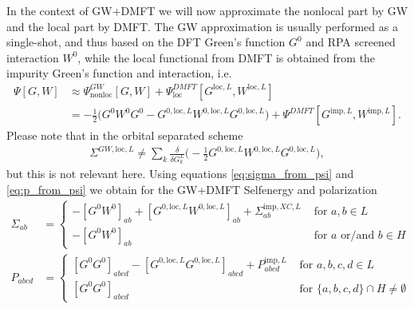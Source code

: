 \documentclass[12pt,a4paper]{scrartcl}
\numberwithin{equation}{section}
\begin{document}
In the context of GW+DMFT we will now approximate the nonlocal part by GW and the local part
by DMFT. The GW approximation is usually performed as a single-shot, and thus
based on the DFT Green's function $G^0$ and RPA screened interaction $W^0$,
while the local functional from DMFT is obtained from the impurity Green's function and
interaction, i.e.
\begin{align}
\Psi[G,W] &\approx \Psi^{GW}_{\mathrm{nonloc}}[G,W] + \Psi^{DMFT}_{\mathrm{loc}}[G^{\mathrm{loc},L},W^{\mathrm{loc},L}] \\
&= -\frac{1}{2}\Big( G^0W^0G^0 - G^{0,\mathrm{loc},L}W^{0,\mathrm{loc},L}G^{0,\mathrm{loc},L}  \Big)
                    + \Psi^{DMFT}[G^{\mathrm{imp},L},W^{\mathrm{imp},L}] .
\end{align}
Please note that in the orbital separated scheme 
\begin{align}
 \Sigma^{GW,\mathrm{loc},L} \neq \sum_k \frac{\delta}{\delta G^L_k}
             \Big( -\frac{1}{2} G^{0,\mathrm{loc},L}W^{0,\mathrm{loc},L}G^{0,\mathrm{loc},L} \Big),
\end{align}
but this is not relevant here.
Using equations \eqref{eq:sigma_from_psi} and \eqref{eq:p_from_psi} we obtain for the GW+DMFT
Selfenergy and polarization
\begin{align}
\Sigma_{ab} &= 
\begin{cases}
-[G^0W^0]_{ab} + [G^{0,\mathrm{loc},L}W^{0,\mathrm{loc},L}]_{ab}+ \Sigma_{ab}^{\mathrm{imp},XC,L} & \mbox{ for } a,b \in L  \\
-[G^0W^0]_{ab}                                                                      & \mbox{ for } a \mbox{ or/and } b \in H 
\end{cases}\\
%
%
P_{abcd} &= 
\begin{cases}
[G^0G^0]_{abcd} - [G^{0,\mathrm{loc},L}G^{0,\mathrm{loc},L}]_{abcd}+ P_{abcd}^{\mathrm{imp},L} & \mbox{ for } a,b,c,d \in L  \\
[G^0G^0]_{abcd}                                                                      & \mbox{ for } \{a,b,c,d\} \cap H  \neq \emptyset
\end{cases}
\end{align}
\end{document}
